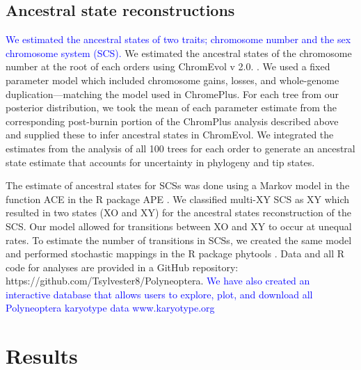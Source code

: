 \documentclass[]{rsos}%
\begin{document}
\subsection{Ancestral state reconstructions}
\textcolor{blue}{We estimated the ancestral states of two traits; chromosome number and the sex chromosome system (SCS).}
We estimated the ancestral states of the chromosome number at the root of each orders using ChromEvol v 2.0. \cite{glick2014chromevol, mayrose2009chromevol}.
We used a fixed parameter model which included chromosome gains, losses, and whole-genome duplication---matching the model used in ChromePlus.
For each tree from our posterior distribution, we took the mean of each parameter estimate from the corresponding post-burnin portion of the ChromPlus analysis described above and supplied these to infer ancestral states in ChromEvol.
We integrated the estimates from the analysis of all 100 trees for each order to generate an ancestral state estimate that accounts for uncertainty in phylogeny and tip states. 

The estimate of ancestral states for SCSs was done using a Markov model in the function ACE in the R package APE \cite{Paradis2018}.
We classified multi-XY SCS as XY which resulted in two states (XO and XY) for the ancestral states reconstruction of the SCS. 
Our model allowed for transitions between XO and XY to occur at unequal rates.
To estimate the number of transitions in SCSs, we created the same model and performed stochastic mappings in the R package phytools \cite{revell2012phytools}.
Data and all R code for analyses are provided in a GitHub repository: https://github.com/Tsylvester8/Polyneoptera. 
\textcolor{blue}{We have also created an interactive database that allows users to explore, plot, and download all Polyneoptera karyotype data www.karyotype.org}

\section{Results}
\end{document}
